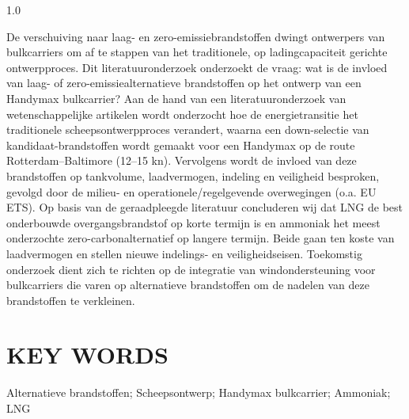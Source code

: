 \documentclass[a4paper]{IMDC2024}
\begin{document}
\begin{center}

    {\fontsize{12}{14}}

    \begin{flushleft}

        \begin{spacing}{1.0}
            \fontsize{10}{12}\selectfont
            \setlength{\parindent}{0.63cm}
            \setlength{\leftskip}{1.27cm}
            \setlength{\rightskip}{1.27cm}

            De verschuiving naar laag- en zero-emissiebrandstoffen dwingt ontwerpers van bulkcarriers om af te stappen van het traditionele, op ladingcapaciteit gerichte ontwerpproces. Dit literatuuronderzoek onderzoekt de vraag: wat is de invloed van laag- of zero-emissiealternatieve brandstoffen op het ontwerp van een Handymax bulkcarrier? Aan de hand van een literatuuronderzoek van wetenschappelijke artikelen wordt onderzocht hoe de energietransitie het traditionele scheepsontwerpproces verandert, waarna een down-selectie van kandidaat-brandstoffen wordt gemaakt voor een Handymax op de route Rotterdam--Baltimore (12--15 kn). Vervolgens wordt de invloed van deze brandstoffen op tankvolume, laadvermogen, indeling en veiligheid besproken, gevolgd door de milieu- en operationele/regelgevende overwegingen (o.a. EU ETS). Op basis van de geraadpleegde literatuur concluderen wij dat LNG de best onderbouwde overgangsbrandstof op korte termijn is en ammoniak het meest onderzochte zero-carbonalternatief op langere termijn. Beide gaan ten koste van laadvermogen en stellen nieuwe indelings- en veiligheidseisen. Toekomstig onderzoek dient zich te richten op de integratie van windondersteuning voor bulkcarriers die varen op alternatieve brandstoffen om de nadelen van deze brandstoffen te verkleinen.
        \end{spacing}
    \end{flushleft}

\end{center}

\setfulljustify
\section{KEY WORDS}

Alternatieve brandstoffen; Scheepsontwerp; Handymax bulkcarrier; Ammoniak; LNG

\end{document}
